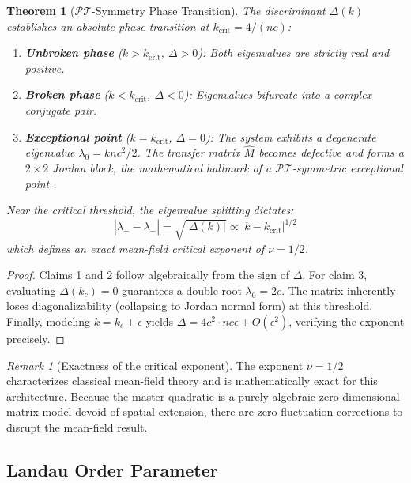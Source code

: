 \documentclass[12pt]{article}
\newcommand{\PT}{\mathcal{PT}}
\newtheorem{theorem}{Theorem}[section]
\theoremstyle{definition}
\theoremstyle{remark}
\newtheorem{remark}{Remark}[section]
\begin{document}
\begin{theorem}[$\PT$-Symmetry Phase Transition]
\label{thm:pt_transition}
The discriminant $\Delta(k)$ establishes an absolute phase transition at $k_{\text{crit}} = 4/(nc)$:
\begin{enumerate}[noitemsep]
    \item \textbf{Unbroken phase} ($k > k_{\text{crit}}$, $\Delta > 0$): Both eigenvalues are strictly real and positive.
    \item \textbf{Broken phase} ($k < k_{\text{crit}}$, $\Delta < 0$): Eigenvalues bifurcate into a complex conjugate pair.
    \item \textbf{Exceptional point} ($k = k_{\text{crit}}$, $\Delta = 0$): The system exhibits a degenerate eigenvalue $\lambda_0 = knc^2/2$. The transfer matrix $\hat{M}$ becomes defective and forms a $2 \times 2$ Jordan block, the mathematical hallmark of a $\PT$-symmetric exceptional point \cite{Bender1998}.
\end{enumerate}
Near the critical threshold, the eigenvalue splitting dictates:
\begin{equation}
    |\lambda_+ - \lambda_-| = \sqrt{|\Delta(k)|} \propto |k - k_{\text{crit}}|^{1/2}
\end{equation}
which defines an exact mean-field critical exponent of $\nu = 1/2$.
\end{theorem}

\begin{proof}
Claims 1 and 2 follow algebraically from the sign of $\Delta$. For claim 3, evaluating $\Delta(k_c) = 0$ guarantees a double root $\lambda_0 = 2c$. The matrix inherently loses diagonalizability (collapsing to Jordan normal form) at this threshold. Finally, modeling $k = k_c + \epsilon$ yields $\Delta = 4c^2 \cdot nc\epsilon + O(\epsilon^2)$, verifying the exponent precisely.
\end{proof}

\begin{remark}[Exactness of the critical exponent]
The exponent $\nu = 1/2$ characterizes classical mean-field theory and is mathematically exact for this architecture. Because the master quadratic is a purely algebraic zero-dimensional matrix model devoid of spatial extension, there are zero fluctuation corrections to disrupt the mean-field result.
\end{remark}

\subsection{Landau Order Parameter}
\end{document}
